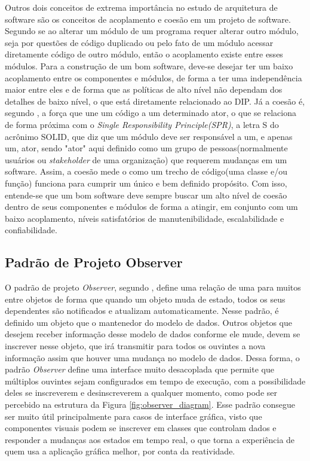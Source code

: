 \documentclass[12pt, %
openright, 
oneside, %
a4paper,    %
brazil]{facom-ufu-abntex2}
\begin{document}
Outros dois conceitos de extrema importância no estudo de arquitetura de software são os conceitos de acoplamento e coesão em um projeto de software. Segundo  se ao alterar um módulo de um programa requer alterar outro módulo, seja por questões de código duplicado ou pelo fato de um módulo acessar diretamente código de outro módulo, então o acoplamento existe entre esses módulos. Para a construção de um bom software, deve-se desejar ter um baixo acoplamento entre os componentes e módulos, de forma a ter uma independência maior entre eles e de forma que as políticas de alto nível não dependam dos detalhes de baixo nível, o que está diretamente relacionado ao DIP. Já a coesão é, segundo , a força que une um código a um determinado ator, o que se relaciona de forma próxima com o \textit{Single Responsibility Principle(SPR)}, a letra S do acrônimo SOLID, que diz que um módulo deve ser responsável a um, e apenas um, ator, sendo "ator" aqui definido como um grupo de pessoas(normalmente usuários ou \textit{stakeholder} de uma organização) que requerem mudanças em um software. Assim, a coesão mede o como um trecho de código(uma classe e/ou função) funciona para cumprir um único e bem definido propósito. Com isso, entende-se que um bom software deve sempre buscar um alto nível de coesão dentro de seus componentes e módulos de forma a atingir, em conjunto com um baixo acoplamento, níveis satisfatórios de manutenibilidade, escalabilidade e confiabilidade.

\subsection{Padrão de Projeto Observer}

O padrão de projeto \textit{Observer}, segundo , define uma relação de uma para muitos entre objetos de forma que quando um objeto muda de estado, todos os seus dependentes são notificados e atualizam automaticamente. Nesse padrão, é definido um objeto que o mantenedor do modelo de dados. Outros objetos que desejem receber informação desse modelo de dados conforme ele mude, devem se inscrever nesse objeto, que irá transmitir para todos os ouvintes a nova informação assim que houver uma mudança no modelo de dados. Dessa forma, o padrão \textit{Observer} define uma interface muito desacoplada que permite que múltiplos ouvintes sejam configurados em tempo de execução, com a possibilidade deles se inscreverem e desinscreverem a qualquer momento, como pode ser percebido na estrutura da Figura \ref{fig:observer_diagram}. Esse padrão consegue ser muito útil principalmente para casos de interface gráfica, visto que componentes visuais podem se inscrever em classes que controlam dados e responder a mudanças aos estados em tempo real, o que torna a experiência de quem usa a aplicação gráfica melhor, por conta da reatividade.
\end{document}
